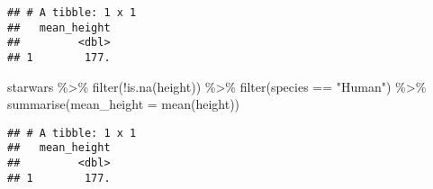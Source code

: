\documentclass[
]{article}
\newenvironment{Shaded}{\begin{snugshade}}{\end{snugshade}}
\newcommand{\AttributeTok}[1]{\textcolor[rgb]{0.77,0.63,0.00}{#1}}
\newcommand{\FunctionTok}[1]{\textcolor[rgb]{0.00,0.00,0.00}{#1}}
\newcommand{\NormalTok}[1]{#1}
\newcommand{\SpecialCharTok}[1]{\textcolor[rgb]{0.00,0.00,0.00}{#1}}
\newcommand{\StringTok}[1]{\textcolor[rgb]{0.31,0.60,0.02}{#1}}
\begin{document}
\begin{verbatim}
## # A tibble: 1 x 1
##   mean_height
##         <dbl>
## 1        177.
\end{verbatim}

\begin{Shaded}
\begin{Highlighting}[]
\NormalTok{starwars }\SpecialCharTok{\%\textgreater{}\%}
  \FunctionTok{filter}\NormalTok{(}\SpecialCharTok{!}\FunctionTok{is.na}\NormalTok{(height)) }\SpecialCharTok{\%\textgreater{}\%}
  \FunctionTok{filter}\NormalTok{(species }\SpecialCharTok{==} \StringTok{"Human"}\NormalTok{) }\SpecialCharTok{\%\textgreater{}\%}
  \FunctionTok{summarise}\NormalTok{(}\AttributeTok{mean\_height =} \FunctionTok{mean}\NormalTok{(height))}
\end{Highlighting}
\end{Shaded}

\begin{verbatim}
## # A tibble: 1 x 1
##   mean_height
##         <dbl>
## 1        177.
\end{verbatim}
\end{document}
